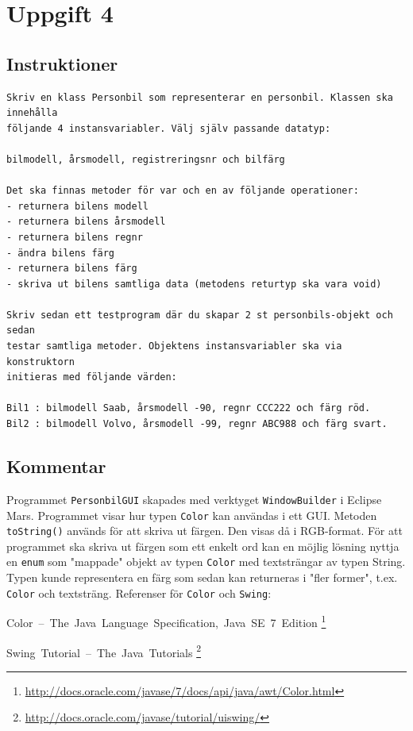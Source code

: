 \section{Uppgift 4}\label{sec:uppg04}

\subsection{Instruktioner}
\begin{Verbatim}[fontsize=\small]
Skriv en klass Personbil som representerar en personbil. Klassen ska innehålla
följande 4 instansvariabler. Välj själv passande datatyp:

bilmodell, årsmodell, registreringsnr och bilfärg

Det ska finnas metoder för var och en av följande operationer:
- returnera bilens modell
- returnera bilens årsmodell
- returnera bilens regnr
- ändra bilens färg
- returnera bilens färg
- skriva ut bilens samtliga data (metodens returtyp ska vara void)

Skriv sedan ett testprogram där du skapar 2 st personbils-objekt och sedan
testar samtliga metoder. Objektens instansvariabler ska via konstruktorn
initieras med följande värden:

Bil1 : bilmodell Saab, årsmodell -90, regnr CCC222 och färg röd.
Bil2 : bilmodell Volvo, årsmodell -99, regnr ABC988 och färg svart.
\end{Verbatim}


\subsection{Kommentar}
Programmet \texttt{PersonbilGUI} skapades med verktyget \texttt{WindowBuilder}
i Eclipse Mars. Programmet visar hur typen \texttt{Color} kan användas i ett
GUI.  Metoden \texttt{toString()} används för att skriva ut färgen. Den visas
då i RGB-format. För att programmet ska skriva ut färgen som ett enkelt ord kan
en möjlig lösning nyttja en \texttt{enum} som "mappade" objekt av typen
\texttt{Color} med textsträngar av typen String. Typen kunde representera en
färg som sedan kan returneras i "fler former", t.ex. \texttt{Color} och
textsträng.
Referenser för \texttt{Color} och \texttt{Swing}:

\mbox{Color -- The Java Language Specification, Java SE 7 Edition}
\footnote{\url{http://docs.oracle.com/javase/7/docs/api/java/awt/Color.html}}

\mbox{Swing Tutorial -- The Java Tutorials}
\footnote{\url{http://docs.oracle.com/javase/tutorial/uiswing/}}


